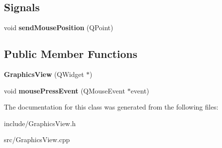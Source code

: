 \subsection*{Signals}
\begin{DoxyCompactItemize}
\item 
\mbox{\label{classGraphicsView_a714015685be9eb1b83cee3090fce8040}} 
void {\bfseries send\+Mouse\+Position} (Q\+Point)
\end{DoxyCompactItemize}
\subsection*{Public Member Functions}
\begin{DoxyCompactItemize}
\item 
\mbox{\label{classGraphicsView_a0d9eb9dcb2de6db21b054c9afa45c35b}} 
{\bfseries Graphics\+View} (Q\+Widget $\ast$)
\item 
\mbox{\label{classGraphicsView_a8d9cb599e552ae981ed0d0f10ebf4b63}} 
void {\bfseries mouse\+Press\+Event} (Q\+Mouse\+Event $\ast$event)
\end{DoxyCompactItemize}


The documentation for this class was generated from the following files\+:\begin{DoxyCompactItemize}
\item 
include/Graphics\+View.\+h\item 
src/Graphics\+View.\+cpp\end{DoxyCompactItemize}
